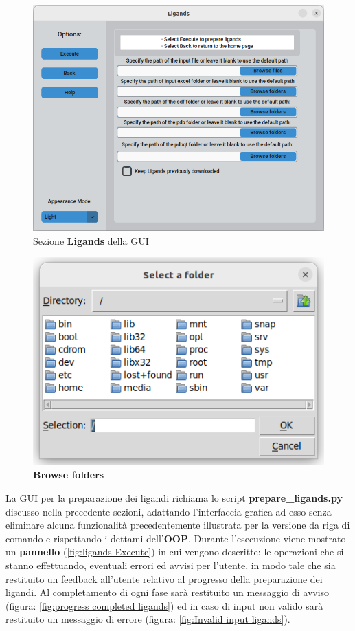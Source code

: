 \begin{figure}[H]
    \centering
    \includegraphics[scale=0.6]{immagini/ligands.png}
    \caption{Sezione \textbf{Ligands} della GUI}
    \label{fig:ligands}
\end{figure}

\begin{figure}[H]
    \centering
    \includegraphics{immagini/browseFoldersLigands.png}
    \caption{\textbf{Browse folders}}
    \label{fig:browse folders ligands}
\end{figure}

La GUI per la preparazione dei ligandi richiama lo script \textbf{prepare\_ligands.py} discusso nella precedente sezioni, adattando l'interfaccia grafica ad esso senza eliminare alcuna funzionalità precedentemente illustrata per la versione da riga di comando e rispettando i dettami dell'\textbf{OOP}.\newline
Durante l'esecuzione viene mostrato un \textbf{pannello} (\ref{fig:ligands Execute}) in cui vengono descritte: le operazioni che si stanno effettuando, eventuali errori ed avvisi per l'utente, in modo tale che sia restituito un feedback all'utente relativo al progresso della preparazione dei ligandi. Al completamento di ogni fase sarà restituito un messaggio di avviso (figura: \ref{fig:progress completed ligands}) ed in caso di input non valido sarà restituito un messaggio di errore (figura: \ref{fig:Invalid input ligands}).

